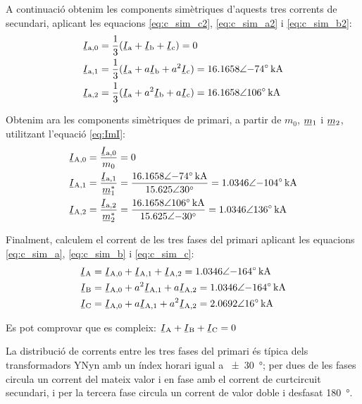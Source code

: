 \begin{exemple}[\CCasimSecTrafo{}]
    A continuació obtenim les components simètriques d'aquests tres corrents de secundari, aplicant les equacions \eqref{eq:c_sim_c2}, \eqref{eq:c_sim_a2} i \eqref{eq:c_sim_b2}:
    \begin{align*}
        \cmplx{I}\ped{a,0} &= \frac{1}{3} (\cmplx{I}\ped{a} + \cmplx{I}\ped{b} +
        \cmplx{I}\ped{c}) = 0 \\
        \cmplx{I}\ped{a,1} &= \frac{1}{3} (\cmplx{I}\ped{a} + a \cmplx{I}\ped{b} +
         a^2 \cmplx{I}\ped{c}) = \complexqty{16,1658:-74}{kA}  \\
        \cmplx{I}\ped{a,2} &= \frac{1}{3} (\cmplx{I}\ped{a} + a^2 \cmplx{I}\ped{b} +
         a \cmplx{I}\ped{c}) = \complexqty{16,1658:106}{kA}
    \end{align*}

    Obtenim ara les components simètriques de primari, a partir de $m_0$, $\cmplx{m}_1$ i $\cmplx{m}_2$, utilitzant l'equació \eqref{eq:ImI}:
    \begin{align*}
        \cmplx{I}\ped{A,0} &= \frac{\cmplx{I}\ped{a,0}}{m_0} = 0 \\
        \cmplx{I}\ped{A,1} &= \frac{\cmplx{I}\ped{a,1}}{\cmplx{m}^*_1} = \frac{\complexqty{16,1658:-74}{kA}}{\complexnum{15,625:30}} =  \complexqty{1,0346:-104}{kA} \\
        \cmplx{I}\ped{A,2} &= \frac{\cmplx{I}\ped{a,2}}{\cmplx{m}^*_2} = \frac{\complexqty{16,1658:106}{kA}}{\complexnum{15,625:-30}} = \complexqty{1,0346:136}{kA}
    \end{align*}

    Finalment, calculem el corrent de les tres fases del primari aplicant les equacions \eqref{eq:c_sim_a}, \eqref{eq:c_sim_b} i \eqref{eq:c_sim_c}:
     \begin{align*}
        \cmplx{I}\ped{A} &= \cmplx{I}\ped{A,0} + \cmplx{I}\ped{A,1} + \cmplx{I}\ped{A,2} = \complexqty{1,0346:-164}{kA} \\
        \cmplx{I}\ped{B} &= \cmplx{I}\ped{A,0} + a^2 \cmplx{I}\ped{A,1} + a \cmplx{I}\ped{A,2} = \complexqty{1,0346:-164}{kA} \\
        \cmplx{I}\ped{C} &= \cmplx{I}\ped{A,0} + a \cmplx{I}\ped{A,1} + a^2 \cmplx{I}\ped{A,2} = \complexqty{2,0692:16}{kA}
    \end{align*}

    Es pot comprovar que es compleix: $\cmplx{I}\ped{A} + \cmplx{I}\ped{B} + \cmplx{I}\ped{C} = 0$

    La distribució de corrents entre les tres fases del primari és típica dels transformadors YNyn amb un índex horari igual a \qty{+-30}{\degree}; per dues de les fases circula un corrent del mateix valor  i en fase amb el corrent de curtcircuit secundari, i per la tercera fase circula un corrent de valor doble i desfasat \qty{180}{\degree}.


\end{exemple}

